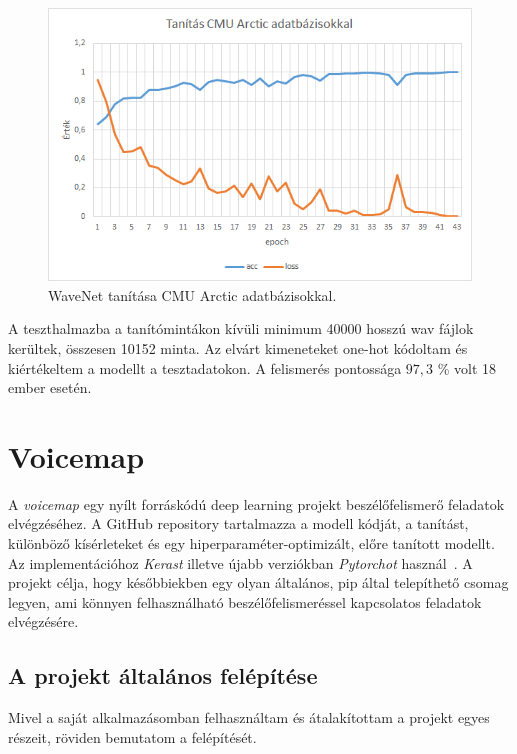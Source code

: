 \begin{figure}[!ht]
	\centering
	\includegraphics[width=150mm, keepaspectratio]{figures/wavenet-train-cmu-arctic.png}
	\caption{WaveNet tanítása CMU Arctic adatbázisokkal.}
	\label{fig:wavenet-train-cmu-arctic}
\end{figure}
A teszthalmazba a tanítómintákon kívüli minimum 40000 hosszú wav fájlok kerültek, összesen 10152 minta.
Az elvárt kimeneteket one-hot kódoltam és kiértékeltem a modellt a tesztadatokon. A felismerés pontossága $97,3$ \% volt 18 ember esetén.

\section{Voicemap}

A \emph{voicemap} egy nyílt forráskódú deep learning projekt beszélőfelismerő feladatok elvégzéséhez. A GitHub repository tartalmazza a modell kódját, a tanítást, különböző kísérleteket és egy hiperparaméter-optimizált, előre tanított modellt. Az implementációhoz \emph{Kerast} illetve újabb verziókban \emph{Pytorchot} használ~\cite{voicemap_github}.
\newline
\newline
A projekt célja, hogy későbbiekben egy olyan általános, pip által telepíthető csomag legyen, ami könnyen felhasználható beszélőfelismeréssel kapcsolatos feladatok elvégzésére.

\subsection{A projekt általános felépítése}

Mivel a saját alkalmazásomban felhasználtam és átalakítottam a projekt egyes részeit,
röviden bemutatom a felépítését.

